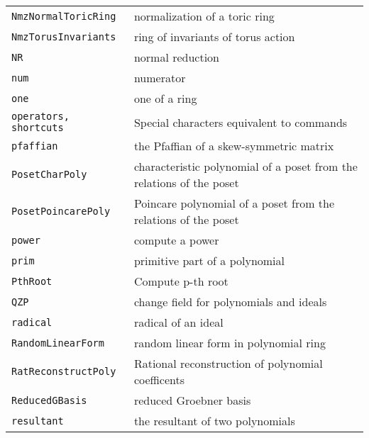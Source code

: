 \documentclass[a4paper]{mybook}
\begin{document}
\begin{center}
\begin{longtable}{ll}
{\verb~NmzNormalToricRing~} &
      normalization of a toric ring\\
   
{\verb~NmzTorusInvariants~} &
      ring of invariants of torus action\\
   
{\verb~NR~} &
      normal reduction\\
   
{\verb~num~} &
      numerator\\
   
{\verb~one~} &
      one of a ring\\
   
{\verb~operators, shortcuts~} &
      Special characters equivalent to commands\\
   
{\verb~pfaffian~} &
      the Pfaffian of a skew-symmetric matrix\\
   
{\verb~PosetCharPoly~} &
      characteristic polynomial of a poset from the relations of the poset\\
   
{\verb~PosetPoincarePoly~} &
      Poincare polynomial of a poset from the relations of the poset\\
   
{\verb~power~} &
      compute a power\\
   
{\verb~prim~} &
      primitive part of a polynomial\\
   
{\verb~PthRoot~} &
      Compute p-th root\\
   
{\verb~QZP~} &
      change field for polynomials and ideals\\
   
{\verb~radical~} &
      radical of an ideal\\
   
{\verb~RandomLinearForm~} &
      random linear form in polynomial ring\\
   
{\verb~RatReconstructPoly~} &
      Rational reconstruction of polynomial coefficents\\
   
{\verb~ReducedGBasis~} &
      reduced Groebner basis\\
   
{\verb~resultant~} &
      the resultant of two polynomials\\
   

\end{longtable}
\end{center}
\end{document}
